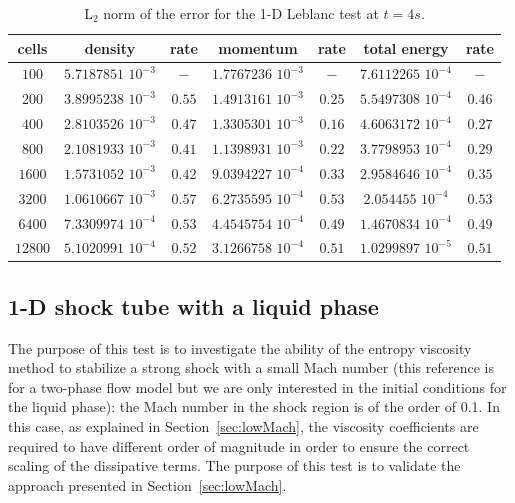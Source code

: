 \documentclass[review,10pt]{elsarticle}
\newcommand{\sct}[1]{Section~\ref{#1}}                   %
\newcommand{\tcr}[1]{\textcolor{red}{#1}}
\newcommand{\tcb}[1]{\textcolor{blue}{#1}}
\begin{document}
\begin{table}[!htbp]
\begin{center}
 \caption{\label{tbl:l2_norm_leblanc} L$_2$ norm of the error for the 1-D Leblanc test at $t=4s$.}
 \begin{tabular}{|c|c|c|c|c|c|c|}
 \hline
   cells & density & rate & momentum & rate & total energy & rate \\ \hline
$100$ &   $5.7187851$ $10^{-3}$ & $-$ & $1.7767236$ $10^{-3}$ & $-$ & $7.6112265$  $10^{-4}$& $-$\\   \hline
$200$  &  $3.8995238$ $10^{-3}$ & $0.55$ & $1.4913161$ $10^{-3}$ & $0.25$ &  $5.5497308$ $10^{-4}$& $0.46$\\ \hline
$400$ & $2.8103526$ $10^{-3}$   & $0.47$ & $1.3305301$ $10^{-3}$ & $0.16$ & $4.6063172$ $10^{-4}$ & $0.27$\\ \hline
$800$ & $2.1081933$ $10^{-3}$   & $0.41$ & $1.1398931$ $10^{-3}$ & $0.22$ & $3.7798953$ $10^{-4}$ & $0.29$\\ \hline
$1600$ & $1.5731052$ $10^{-3}$  & $0.42$ & $9.0394227$ $10^{-4}$ & $0.33$ & $2.9584646$ $10^{-4}$ & $0.35$\\ \hline
$3200$&$1.0610667$ $10^{-3}$    & $0.57$ & $6.2735595$ $10^{-4}$ & $0.53$ & $2.054455$ $10^{-4}$ & $0.53$\\ \hline
$6400$&$7.3309974$ $10^{-4}$    & $0.53$ & $4.4545754$ $10^{-4}$ & $0.49$ & $1.4670834$ $10^{-4}$ & $0.49$\\ \hline
 $12800$&$5.1020991$ $10^{-4}$  & $0.52$ & $3.1266758$ $10^{-4}$ & $0.51$ & $1.0299897$ $10^{-5}$ & $0.51$\\  \hline
\end{tabular}
\end{center}
\nonumber
\end{table}

\subsection{1-D shock tube with a liquid phase} \label{sec:liquid_shock}
The purpose of this test is to investigate the ability of the entropy viscosity method to stabilize a strong 
shock with a small Mach number \cite{abgrall} (this reference is for a two-phase flow model but we are only 
interested in the initial conditions for the liquid phase): the Mach number in the shock region is of the 
order of 0.1. In this case, as explained in \sct{sec:lowMach}, the viscosity coefficients are required to 
have different order of magnitude in order to ensure the correct scaling of the dissipative terms. 
The purpose of this test is to validate the approach presented in \sct{sec:lowMach}. 
\end{document}
